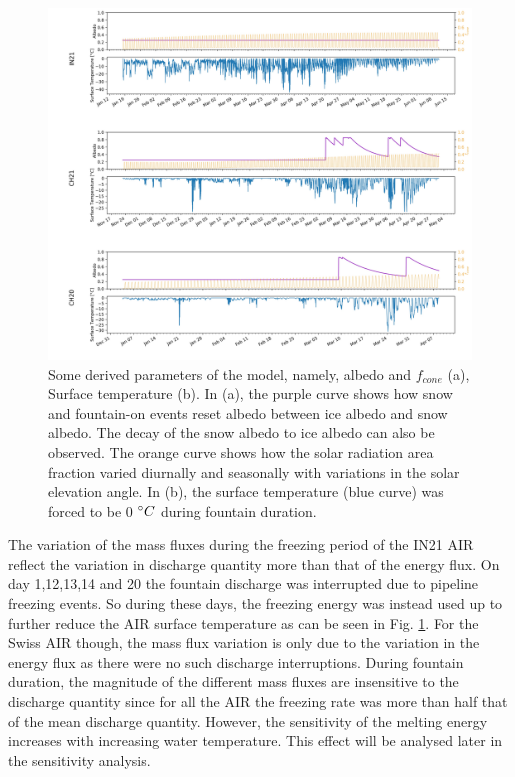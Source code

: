 \documentclass[utf8]{frontiersSCNS} %
\begin{document}
\begin{figure}
	\begin{center}
		\includegraphics[width=\linewidth]{Figures/albedo.jpg}
	\end{center}
	\caption{Some derived parameters of the model, namely, albedo and $f_{cone}$ (a), Surface temperature (b). In
		(a), the purple curve shows how snow and fountain-on events reset albedo between ice albedo and snow albedo.  The
		decay of the snow albedo to ice albedo can also be observed. The orange curve shows how the solar radiation area
		fraction varied diurnally and seasonally with variations in the solar elevation angle. In (b), the surface
		temperature (blue curve) was forced to be 0 $\degree C$ during fountain duration.}
	\label{fig:albedo}
\end{figure}

The variation of the mass fluxes during the freezing period of the IN21 AIR reflect the variation in discharge quantity
more than that of the energy flux. On day 1,12,13,14 and 20 the fountain discharge was interrupted due to pipeline
freezing events. So during these days, the freezing energy was instead used up to further reduce the AIR surface
temperature as can be seen in Fig. \ref{fig:albedo}. For the Swiss AIR though, the mass flux variation is only due to
the variation in the energy flux as there were no such discharge interruptions. During fountain duration, the magnitude
of the different mass fluxes are insensitive to the discharge quantity since for all the AIR the freezing rate was more
than half that of the mean discharge quantity. However, the sensitivity of the melting energy increases with increasing
water temperature. This effect will be analysed later in the sensitivity analysis.
\end{document}
